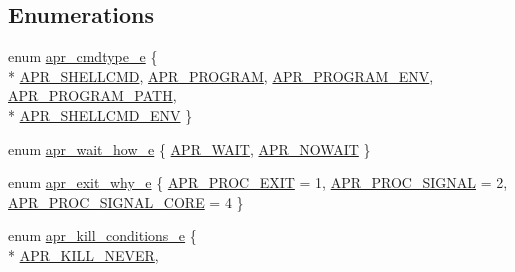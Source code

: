 \subsection*{Enumerations}
\begin{DoxyCompactItemize}
\item 
enum \hyperlink{group__apr__thread__proc_gadcb981d7748c580eb69ac11dbf709060}{apr\-\_\-cmdtype\-\_\-e} \{ \\*
\hyperlink{group__apr__thread__proc_ggadcb981d7748c580eb69ac11dbf709060a02f5d83f79e2c12bfca5a86d7f14caa6}{A\-P\-R\-\_\-\-S\-H\-E\-L\-L\-C\-M\-D}, 
\hyperlink{group__apr__thread__proc_ggadcb981d7748c580eb69ac11dbf709060ac128c1239a524cf21300b8ed6248ac99}{A\-P\-R\-\_\-\-P\-R\-O\-G\-R\-A\-M}, 
\hyperlink{group__apr__thread__proc_ggadcb981d7748c580eb69ac11dbf709060a6a3f9694aced0e449f6bb4b3e437233a}{A\-P\-R\-\_\-\-P\-R\-O\-G\-R\-A\-M\-\_\-\-E\-N\-V}, 
\hyperlink{group__apr__thread__proc_ggadcb981d7748c580eb69ac11dbf709060aa424b51bdc16e4d18bb757a32c6a346a}{A\-P\-R\-\_\-\-P\-R\-O\-G\-R\-A\-M\-\_\-\-P\-A\-T\-H}, 
\\*
\hyperlink{group__apr__thread__proc_ggadcb981d7748c580eb69ac11dbf709060afcefc45317b67fad6dc5459772ce9409}{A\-P\-R\-\_\-\-S\-H\-E\-L\-L\-C\-M\-D\-\_\-\-E\-N\-V}
 \}
\item 
enum \hyperlink{group__apr__thread__proc_ga5e52d786644f3b66d6180571e68c7260}{apr\-\_\-wait\-\_\-how\-\_\-e} \{ \hyperlink{group__apr__thread__proc_gga5e52d786644f3b66d6180571e68c7260a057885ccf4b8b707e0d115c691037de4}{A\-P\-R\-\_\-\-W\-A\-I\-T}, 
\hyperlink{group__apr__thread__proc_gga5e52d786644f3b66d6180571e68c7260a0163031f6b72b0c4add9108052a672d5}{A\-P\-R\-\_\-\-N\-O\-W\-A\-I\-T}
 \}
\item 
enum \hyperlink{group__apr__thread__proc_gac097b4fa41e67024711c5983446d0951}{apr\-\_\-exit\-\_\-why\-\_\-e} \{ \hyperlink{group__apr__thread__proc_ggac097b4fa41e67024711c5983446d0951a977f140c82333af62aa4bed8c99a3ee2}{A\-P\-R\-\_\-\-P\-R\-O\-C\-\_\-\-E\-X\-I\-T} = 1, 
\hyperlink{group__apr__thread__proc_ggac097b4fa41e67024711c5983446d0951a7e3421d18abe458ca27822d19424225b}{A\-P\-R\-\_\-\-P\-R\-O\-C\-\_\-\-S\-I\-G\-N\-A\-L} = 2, 
\hyperlink{group__apr__thread__proc_ggac097b4fa41e67024711c5983446d0951a6b667be4983cb59e9bed37ee05a0dcce}{A\-P\-R\-\_\-\-P\-R\-O\-C\-\_\-\-S\-I\-G\-N\-A\-L\-\_\-\-C\-O\-R\-E} = 4
 \}
\item 
enum \hyperlink{group__apr__thread__proc_ga3eaec78633742e7e0cb9480a21477aff}{apr\-\_\-kill\-\_\-conditions\-\_\-e} \{ \\*
\hyperlink{group__apr__thread__proc_gga3eaec78633742e7e0cb9480a21477affa33580ab0809e9498855fbdde8a1714ef}{A\-P\-R\-\_\-\-K\-I\-L\-L\-\_\-\-N\-E\-V\-E\-R}, 

\end{DoxyCompactItemize}
